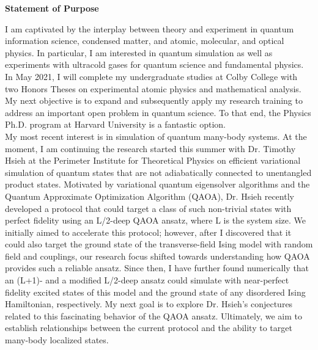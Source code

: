 \documentclass[12pt]{article}
\begin{document}
\begin{center}
	\textbf{Statement of Purpose}
\end{center}
I am captivated by the interplay between theory and experiment in quantum information science, condensed matter, and atomic, molecular, and optical physics. In particular, I am interested in  quantum simulation as well as experiments with ultracold gases for quantum science and fundamental physics. In May 2021, I will complete my undergraduate studies at Colby College with two Honors Theses on experimental atomic physics and mathematical analysis. My next objective is to expand and subsequently apply my research training to address an important open problem in quantum science. To that end, the Physics Ph.D. program at Harvard University is a fantastic option.  \\ 

My most recent interest is in simulation of quantum many-body systems. At the moment, I am continuing the research started this summer with Dr. Timothy Hsieh at the Perimeter Institute for Theoretical Physics on efficient variational simulation of quantum states that are not adiabatically connected to unentangled product states. Motivated by variational quantum eigensolver algorithms and the Quantum Approximate Optimization Algorithm (QAOA), Dr. Hsieh recently developed a protocol that could target a class of such non-trivial  states with perfect fidelity using an L/2-deep QAOA ansatz, where L is the system size. We initially aimed to accelerate this protocol; however, after I discovered that it could also target the ground state of the transverse-field Ising model with random field and couplings, our research focus shifted towards understanding how QAOA provides such a reliable ansatz. Since then, I have further found numerically that an (L+1)- and a modified L/2-deep ansatz could simulate with near-perfect fidelity excited states of this model and the ground state of any disordered Ising Hamiltonian, respectively. My next goal is to explore Dr. Hsieh's conjectures related to this fascinating behavior of the QAOA ansatz. Ultimately, we aim to establish relationships between the current protocol and the ability to target many-body localized states.\\
\end{document}
